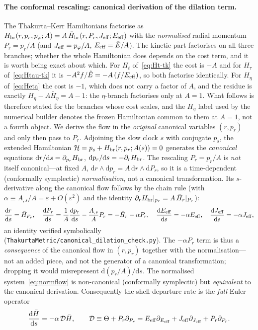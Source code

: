 \documentclass[12pt]{iopart}
\theoremstyle{plain}
\theoremstyle{definition}
\theoremstyle{remark}
\newcommand{\Ehat}{\hat E}
\newcommand{\dd}{\mathrm{d}}
\begin{document}
\paragraph{The conformal rescaling: canonical derivation of the dilation term.} The
Thakurta--Kerr Hamiltonians factorise as
$H_{\rm br}(r,p_r,p_\varphi;A)=A\,\bar H_{\rm br}(r,P_r,J_{\rm eff};E_{\rm eff})$ with the
\emph{normalised} radial momentum $P_r=p_r/A$ (and $J_{\rm eff}=p_\varphi/A$,
$E_{\rm eff}=\Ehat/A$). The kinetic part factorises on all three branches; whether
the whole Hamiltonian does depends on the cost term, and it is worth being exact
about which. For $H_t$ of~\eqref{eq:Ht-tk} the cost is $-A$ and for $H_\tau$
of~\eqref{eq:Htau-tk} it is $-A^2f/\Ehat=-A\,(f/E_{\rm eff})$, so both factorise
identically. For $H_\eta$ of~\eqref{eq:Heta} the cost is $-1$, which does not
carry a factor of $A$, and the residue is exactly
$H_\eta-A\bar H_\eta=A-1$: the $\eta$-branch factorises only at $A=1$. What
follows is therefore stated for the branches whose cost scales, and the
$H_\eta$ label used by the numerical builder denotes the frozen Hamiltonian
common to them at $A=1$, not a fourth object. We derive the flow in the \emph{original} canonical variables
$(r,p_r)$ and only then pass to $P_r$. Adjoining the slow clock $s$ with conjugate
$p_s$, the extended Hamiltonian $\mathcal H=p_s+H_{\rm br}(r,p_r;A(s))=0$ generates the
\emph{canonical} equations $\dd r/\dd s=\partial_{p_r}H_{\rm br}$,
$\dd p_r/\dd s=-\partial_r H_{\rm br}$. The rescaling $P_r=p_r/A$ is \emph{not} itself
canonical---at fixed $A$, $\dd r\wedge\dd p_r=A\,\dd r\wedge\dd P_r$, so it is a
time-dependent (conformally symplectic) \emph{normalisation}, not a canonical
transformation. Its $s$-derivative along the canonical flow follows by the chain rule
(with $\alpha\equiv A_{,s}/A=\varepsilon+O(\varepsilon^2)$ and the identity
$\partial_r H_{\rm br}|_{p_r}=A\,\bar H_r|_{P_r}$):
\begin{equation}
    \frac{\dd r}{\dd s}=\bar H_{P_r},\quad
    \frac{\dd P_r}{\dd s}=\frac1A\frac{\dd p_r}{\dd s}-\frac{A_{,s}}{A}P_r
      =-\bar H_r-\alpha P_r,\quad
    \frac{\dd E_{\rm eff}}{\dd s}=-\alpha E_{\rm eff},\quad
    \frac{\dd J_{\rm eff}}{\dd s}=-\alpha J_{\rm eff},
    \label{eq:normflow}
\end{equation}
an identity verified symbolically (\texttt{ThakurtaMetric/canonical\_dilation\_check.py}).
The $-\alpha P_r$ term is thus a \emph{consequence} of the canonical flow in $(r,p_r)$
together with the normalisation---not an added piece, and not the generator of a
canonical transformation; dropping it would misrepresent $\dd(p_r/A)/\dd s$. The
normalised system~\eqref{eq:normflow} is non-canonical (conformally symplectic) but
\emph{equivalent} to the canonical derivation. Consequently the shell-departure rate is
the \emph{full} Euler operator
\begin{equation}
    \frac{\dd\bar H}{\dd s}=-\alpha\,\mathcal D\bar H,\qquad
    \mathcal D\equiv\Theta+P_r\partial_{P_r}
    =E_{\rm eff}\partial_{E_{\rm eff}}+J_{\rm eff}\partial_{J_{\rm eff}}+P_r\partial_{P_r}.
    \label{eq:Dop}
\end{equation}
\end{document}
